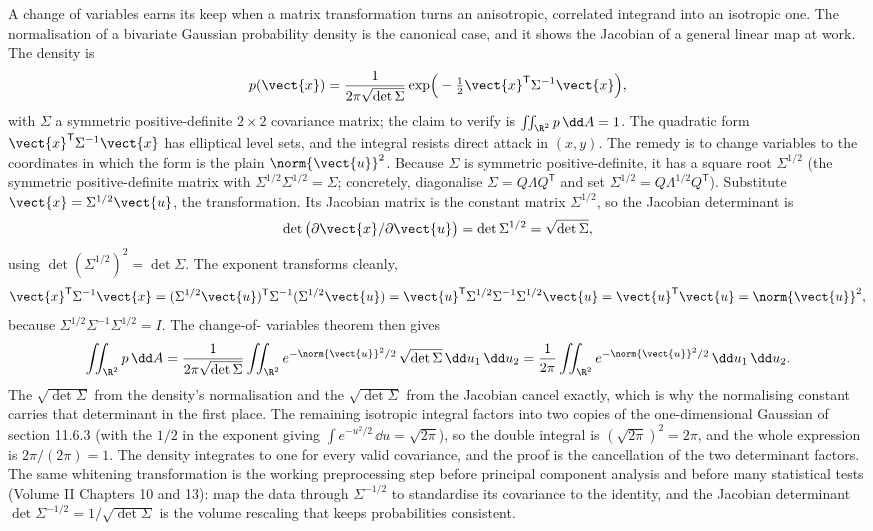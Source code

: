 A change of variables earns its keep when a matrix transformation
turns an anisotropic, correlated integrand into an isotropic one. The
normalisation of a bivariate Gaussian probability density is the
canonical case, and it shows the Jacobian of a general linear map at
work. The density is
\[
p(\vect{x}) = \frac{1}{2\pi\sqrt{\det\Sigma}}
\exp\!\Big(-\tfrac{1}{2}\vect{x}^{\mathsf{T}}\Sigma^{-1}\vect{x}\Big),
\]
with $\Sigma$ a symmetric positive-definite $2\times 2$ covariance
matrix; the claim to verify is $\iint_{\R^{2}} p\,\dd A = 1$. The
quadratic form $\vect{x}^{\mathsf{T}}\Sigma^{-1}\vect{x}$ has
elliptical level sets, and the integral resists direct attack in
$(x, y)$. The remedy is to change variables to the coordinates in
which the form is the plain $\norm{\vect{u}}^{2}$. Because $\Sigma$
is symmetric positive-definite, it has a square root $\Sigma^{1/2}$
(the symmetric positive-definite matrix with $\Sigma^{1/2}\Sigma^{1/2}
= \Sigma$; concretely, diagonalise $\Sigma = Q\Lambda Q^{\mathsf{T}}$
and set $\Sigma^{1/2} = Q\Lambda^{1/2}Q^{\mathsf{T}}$). Substitute
$\vect{x} = \Sigma^{1/2}\vect{u}$, the 
transformation. Its Jacobian matrix is the constant matrix
$\Sigma^{1/2}$, so the Jacobian determinant is
\[
\det\big(\partial\vect{x}/\partial\vect{u}\big) = \det\Sigma^{1/2}
= \sqrt{\det\Sigma},
\]
using $\det(\Sigma^{1/2})^{2} = \det\Sigma$. The exponent
transforms cleanly,
\[
\vect{x}^{\mathsf{T}}\Sigma^{-1}\vect{x} =
(\Sigma^{1/2}\vect{u})^{\mathsf{T}}\Sigma^{-1}(\Sigma^{1/2}\vect{u})
= \vect{u}^{\mathsf{T}}\Sigma^{1/2}\Sigma^{-1}\Sigma^{1/2}\vect{u}
= \vect{u}^{\mathsf{T}}\vect{u} = \norm{\vect{u}}^{2},
\]
because $\Sigma^{1/2}\Sigma^{-1}\Sigma^{1/2} = I$. The change-of-
variables theorem then gives
\[
\iint_{\R^{2}} p\,\dd A
= \frac{1}{2\pi\sqrt{\det\Sigma}}\iint_{\R^{2}}
e^{-\norm{\vect{u}}^{2}/2}\,\sqrt{\det\Sigma}\,\dd u_{1}\,\dd u_{2}
= \frac{1}{2\pi}\iint_{\R^{2}} e^{-\norm{\vect{u}}^{2}/2}\,
\dd u_{1}\,\dd u_{2}.
\]
The $\sqrt{\det\Sigma}$ from the density's normalisation and the
$\sqrt{\det\Sigma}$ from the Jacobian cancel exactly, which is why
the normalising constant carries that determinant in the first place.
The remaining isotropic integral factors into two copies of the
one-dimensional Gaussian of section 11.6.3 (with the $1/2$ in the
exponent giving $\int e^{-u^{2}/2}\,\dd u = \sqrt{2\pi}$), so the
double integral is $(\sqrt{2\pi})^{2} = 2\pi$, and the whole
expression is $2\pi/(2\pi) = 1$. The density integrates to one for
every valid covariance, and the proof is the cancellation of the two
determinant factors. The same whitening transformation is the working
preprocessing step before principal component analysis and before
many statistical tests (Volume II Chapters 10 and 13): map the data
through $\Sigma^{-1/2}$ to standardise its covariance to the identity,
and the Jacobian determinant $\det\Sigma^{-1/2} = 1/\sqrt{\det\Sigma}$
is the volume rescaling that keeps probabilities consistent.

